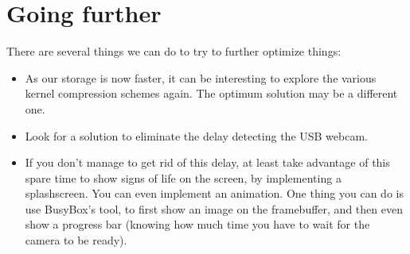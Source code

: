 \section{Going further}

There are several things we can do to try to further optimize things:

\begin{itemize}
\item As our storage is now faster, it can be interesting to explore the
various kernel compression schemes again. The optimum solution may be a
different one.
\item Look for a solution to eliminate the delay detecting the USB
webcam.
\item If you don't manage to get rid of this delay, at least take
advantage of this spare time to show signs of life on the screen, by
implementing a splashscreen. You can even implement an animation.
One thing you can do is use BusyBox's  tool, to first
show an image on the framebuffer, and then even show a progress bar
(knowing how much time you have to wait for the camera to be ready).
\end{itemize}

